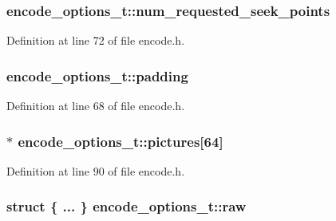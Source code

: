 \subsubsection[{\texorpdfstring{num\+\_\+requested\+\_\+seek\+\_\+points}{num_requested_seek_points}}]{ encode\+\_\+options\+\_\+t\+::num\+\_\+requested\+\_\+seek\+\_\+points}\hypertarget{structencode__options__t_a3ac6bc6544107e15122bb36ac295580c}{}\label{structencode__options__t_a3ac6bc6544107e15122bb36ac295580c}


Definition at line 72 of file encode.\+h.

\subsubsection[{\texorpdfstring{padding}{padding}}]{ encode\+\_\+options\+\_\+t\+::padding}\hypertarget{structencode__options__t_a7f23939295f899302548b192c67e5cd9}{}\label{structencode__options__t_a7f23939295f899302548b192c67e5cd9}


Definition at line 68 of file encode.\+h.

\subsubsection[{\texorpdfstring{pictures}{pictures}}]{$\ast$ encode\+\_\+options\+\_\+t\+::pictures\mbox{[}64\mbox{]}}\hypertarget{structencode__options__t_a25ff2109c4908b7572ee5cae1a16ea98}{}\label{structencode__options__t_a25ff2109c4908b7572ee5cae1a16ea98}


Definition at line 90 of file encode.\+h.

\subsubsection[{\texorpdfstring{raw}{raw}}]{\setlength{\rightskip}{0pt plus 5cm}struct \{ ... \}   encode\+\_\+options\+\_\+t\+::raw}\hypertarget{structencode__options__t_a6a424b6bffa064c5af8b9c7a65645762}{}\label{structencode__options__t_a6a424b6bffa064c5af8b9c7a65645762}
